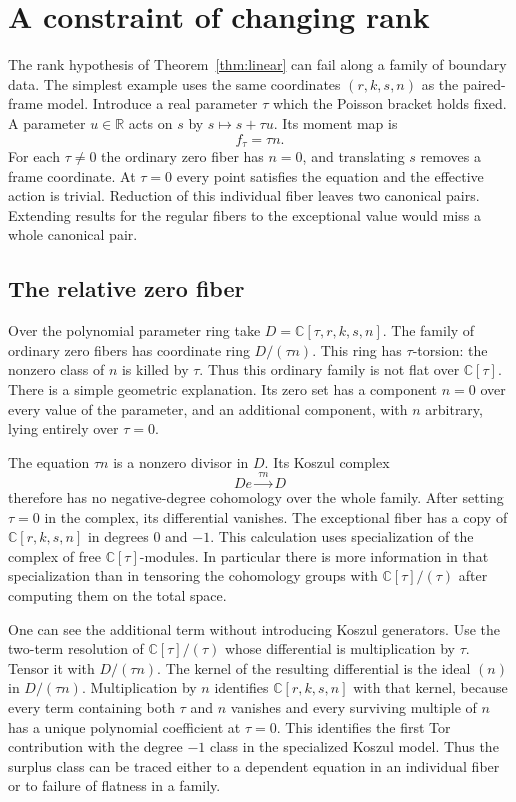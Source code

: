 \documentclass[11pt,letterpaper]{article}
\newcommand{\CC}{\mathbb C}
\newcommand{\RR}{\mathbb R}
\begin{document}
\section{A constraint of changing rank}
\label{sec:rank}
The rank hypothesis of Theorem~\ref{thm:linear} can fail along a family of boundary data. The
simplest example uses the same coordinates $(r,k,s,n)$ as the paired-frame model. Introduce a
real parameter $\tau$ which the Poisson bracket holds fixed. A parameter $u\in\RR$ acts on $s$
by $s\mapsto s+\tau u$. Its moment map is
\begin{equation}
 f_\tau=\tau n .
 \label{eq:rank-jump}
\end{equation}
For each $\tau\ne0$ the ordinary zero fiber has $n=0$, and translating $s$ removes a frame
coordinate. At $\tau=0$ every point satisfies the equation and the effective action is trivial.
Reduction of this individual fiber leaves two canonical pairs. Extending results for the
regular fibers to the exceptional value would miss a whole canonical pair.

\subsection{The relative zero fiber}
Over the polynomial parameter ring take $D=\CC[\tau,r,k,s,n]$. The family of ordinary zero
fibers has coordinate ring $D/(\tau n)$. This ring has $\tau$-torsion: the nonzero class of $n$
is killed by $\tau$. Thus this ordinary family is not flat over $\CC[\tau]$. There is a simple
geometric explanation. Its zero set has a component $n=0$ over every value of the parameter,
and an additional component, with $n$ arbitrary, lying entirely over $\tau=0$.

The equation $\tau n$ is a nonzero divisor in $D$. Its Koszul complex
\[
 D e \xrightarrow{\ \tau n\ }D
\]
therefore has no negative-degree cohomology over the whole family. After setting $\tau=0$ in
the complex, its differential vanishes. The exceptional fiber has a copy of $\CC[r,k,s,n]$ in
degrees $0$ and $-1$. This calculation uses specialization of the complex of free
$\CC[\tau]$-modules. In particular there is more information in that specialization than in
tensoring the cohomology groups with $\CC[\tau]/(\tau)$ after computing them on the total
space.

One can see the additional term without introducing Koszul generators. Use the two-term
resolution of $\CC[\tau]/(\tau)$ whose differential is multiplication by $\tau$. Tensor it with
$D/(\tau n)$. The kernel of the resulting differential is the ideal $(n)$ in $D/(\tau n)$.
Multiplication by $n$ identifies $\CC[r,k,s,n]$ with that kernel, because every term containing
both $\tau$ and $n$ vanishes and every surviving multiple of $n$ has a unique polynomial
coefficient at $\tau=0$. This identifies the first Tor contribution with the degree $-1$ class
in the specialized Koszul model. Thus the surplus class can be traced either to a dependent
equation in an individual fiber or to failure of flatness in a family.
\end{document}
